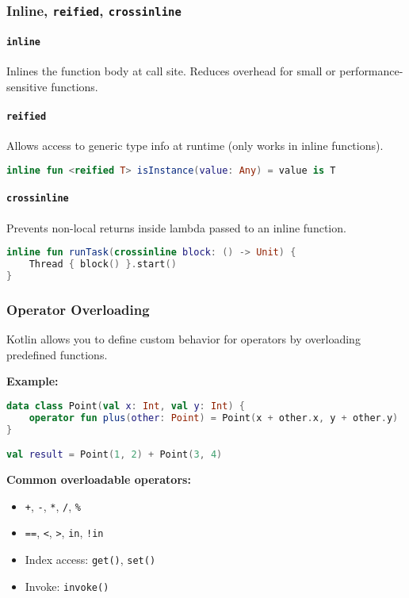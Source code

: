 \documentclass[a4paper,12pt]{article}
\begin{document}
\subsubsection{Inline, \texttt{reified}, \texttt{crossinline}}

\paragraph{\texttt{inline}} Inlines the function body at call site. Reduces overhead for small or performance-sensitive functions.

\paragraph{\texttt{reified}} Allows access to generic type info at runtime (only works in inline functions).
\begin{lstlisting}[language=Kotlin]
inline fun <reified T> isInstance(value: Any) = value is T
\end{lstlisting}

\paragraph{\texttt{crossinline}} Prevents non-local returns inside lambda passed to an inline function.
\begin{lstlisting}[language=Kotlin]
inline fun runTask(crossinline block: () -> Unit) {
    Thread { block() }.start()
}
\end{lstlisting}

\subsubsection{Operator Overloading}

Kotlin allows you to define custom behavior for operators by overloading predefined functions.

\textbf{Example:}
\begin{lstlisting}[language=Kotlin]
data class Point(val x: Int, val y: Int) {
    operator fun plus(other: Point) = Point(x + other.x, y + other.y)
}

val result = Point(1, 2) + Point(3, 4)
\end{lstlisting}

\textbf{Common overloadable operators:}
\begin{itemize}
  \item \texttt{+}, \texttt{-}, \texttt{*}, \texttt{/}, \texttt{\%}
  \item \texttt{==}, \texttt{<}, \texttt{>}, \texttt{in}, \texttt{!in}
  \item Index access: \texttt{get()}, \texttt{set()}
  \item Invoke: \texttt{invoke()}
\end{itemize}
\end{document}
